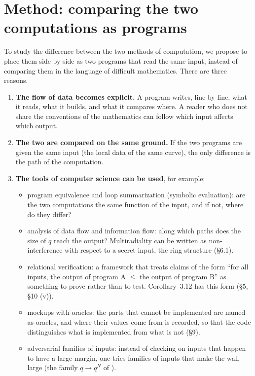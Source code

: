 \documentclass[11pt,a4paper]{article}
\newcommand{\lab}[2]{{\upshape\fcolorbox{#1}{#1!8}{\scriptsize\sffamily\bfseries\textcolor{#1}{#2}}}}
\newcommand{\tagH}{\lab{BurntOrange}{H}}
\begin{document}
\section{Method: comparing the two computations as programs}
\tagH{} To study the difference between the two methods of computation, we propose to place them side by side as two
programs that read the same input, instead of comparing them in the language of difficult mathematics. There are three
reasons.
\begin{enumerate}
\item \textbf{The flow of data becomes explicit.} A program writes, line by line, what it reads, what it builds, and
what it compares where. A reader who does not share the conventions of the mathematics can follow which input affects
which output.
\item \textbf{The two are compared on the same ground.} If the two programs are given the same input (the local data of
the same curve), the only difference is the path of the computation.
\item \textbf{The tools of computer science can be used}, for example:
\begin{itemize}
\item program equivalence and loop summarization (symbolic evaluation): are the two computations the same function of
the input, and if not, where do they differ?
\item analysis of data flow and information flow: along which paths does the size of $q$ reach the output?
Multiradiality can be written as non-interference with respect to a secret input, the ring structure (\S6.1).
\item relational verification: a framework that treats claims of the form ``for all inputs, the output of program A
$\le$ the output of program B'' as something to prove rather than to test. Corollary~3.12 has this form (\S5, \S10
(v)).
\item mockups with oracles: the parts that cannot be implemented are named as oracles, and where their values come from
is recorded, so that the code distinguishes what is implemented from what is not (\S9).
\item adversarial families of inputs: instead of checking on inputs that happen to have a large margin, one tries
families of inputs that make the wall large (the family $q\to q^N$ of \cite{RF}).
\end{itemize}
\end{enumerate}
\end{document}
